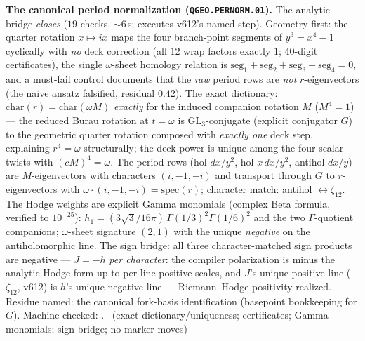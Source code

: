 \par\smallskip\noindent\textbf{The canonical period normalization
(\texttt{QGEO.PERNORM.01}).}
The analytic bridge \emph{closes} ($19$ checks, ${\sim}6$\,s;
executes v612's named step).  Geometry first: the quarter rotation
$x\mapsto ix$ maps the four branch-point segments of $y^3=x^4-1$
cyclically with \emph{no} deck correction (all $12$ wrap factors
exactly $1$; $40$-digit certificates), the single $\omega$-sheet
homology relation is $\mathrm{seg}_1+\mathrm{seg}_2+\mathrm{seg}_3
+\mathrm{seg}_4=0$, and a must-fail control documents that the
\emph{raw} period rows are \emph{not} $r$-eigenvectors (the naive
ansatz falsified, residual $0.42$).  The exact dictionary:
$\mathrm{char}(r)=\mathrm{char}(\omega M)$ \emph{exactly} for the
induced companion rotation $M$ ($M^4=1$) --- the reduced Burau
rotation at $t=\omega$ is $\mathrm{GL}_3$-conjugate (explicit
conjugator $G$) to the geometric quarter rotation composed with
\emph{exactly one} deck step, explaining $r^4=\omega$ structurally;
the deck power is unique among the four scalar twists with
$(cM)^4=\omega$.  The period rows (hol $dx/y^2$, hol $x\,dx/y^2$,
antihol $\overline{dx/y}$) are $M$-eigenvectors with characters
$(i,-1,-i)$ and transport through $G$ to $r$-eigenvectors with
$\omega\cdot(i,-1,-i)=\mathrm{spec}(r)$; character match: antihol
$\leftrightarrow\zeta_{12}$.  The Hodge weights are explicit Gamma
monomials (complex Beta formula, verified to $10^{-25}$):
$h_1=(3\sqrt3/16\pi)\,\Gamma(1/3)^2\Gamma(1/6)^2$ and the two
$\Gamma$-quotient companions; $\omega$-sheet signature $(2,1)$ with
the unique \emph{negative} on the antiholomorphic line.  The sign
bridge: all three character-matched sign products are negative ---
$J=-h$ \emph{per character}: the compiler polarization is minus the
analytic Hodge form up to per-line positive scales, and $J$'s unique
positive line ($\zeta_{12}$, v612) is $h$'s unique negative line ---
Riemann--Hodge positivity realized.  Residue named: the canonical
fork-basis identification (basepoint bookkeeping for $G$).
Machine-checked: .
\mE\ (exact dictionary/uniqueness; certificates; Gamma monomials;
sign bridge; no marker moves)
\par\smallskip

